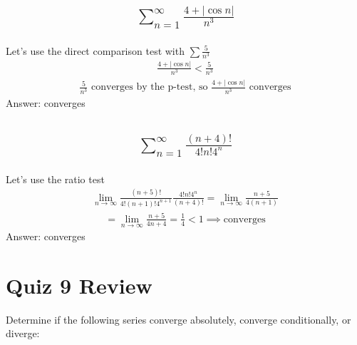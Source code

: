 \documentclass{article}
\begin{document}
\subsection{
	\begin{align*}
		\sum_{n = 1}^{\infty} \frac{4 + |\cos{n}|}{n^3}
	\end{align*}
}
Let's use the direct comparison test with $\sum \frac{5}{n^3}$
\begin{align*}
	\frac{4 + |\cos{n}|}{n^3} < \frac{5}{n^3}
\end{align*}
\begin{align*}
	\frac{5}{n^3} \text{ converges by the p-test, so } \frac{4 + |\cos{n}|}{n^3} \text{ converges}
\end{align*}
Answer: converges

\subsection{
	\begin{align*}
		\sum_{n = 1}^{\infty} \frac{(n + 4)!}{4!n!4^n}
	\end{align*}
}
Let's use the ratio test
\begin{align*}
	\lim_{n \to \infty} {\frac{(n + 5)!}{4!(n + 1)!4^{n + 1}} \frac{4!n!4^n}{(n + 4)!}} = \lim_{n \to \infty} {\frac{n + 5}{4(n + 1)}}
\end{align*}
\begin{align*}
	= \lim_{n \to \infty} {\frac{n + 5}{4n + 4}} = \frac{1}{4} < 1 \implies \text{converges}
\end{align*}
Answer: converges















\newpage
\section{Quiz 9 Review}
Determine if the following series converge absolutely, converge conditionally, or diverge:
\end{document}
